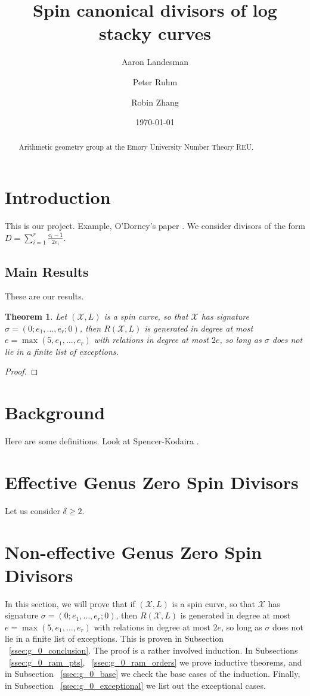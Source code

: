 \documentclass{amsart}
\title{Spin canonical divisors of log stacky curves}
\author{Aaron Landesman}
\author{Peter Ruhm}
\author{Robin Zhang}
\date{\today}
\theoremstyle{plain}
\newtheorem{thm}{Theorem}[section]
\theoremstyle{definition}
\theoremstyle{remark}
\numberwithin{equation}{section}
\newcommand \sx{\mathscr X}
\newcommand \halfcan{L}
\newcommand \subhalf[1]{\frac{e_{#1} - 1}{2e_{#1}}}
\begin{document}
\begin{abstract}
  Arithmetic geometry group at the Emory University Number Theory
	REU.
\end{abstract}

\maketitle

\section{Introduction}
This is our project.
Example, O'Dorney's paper \cite{dorney:canonical}.
We consider divisors of the form $D = \sum_{i = 1}^{r} \subhalf{i}$.

\subsection{Main Results}
These are our results.
\begin{thm}
\label{thm:g_0_generators_relations}
Let $(\sx,\halfcan)$ is a spin curve, so that $\sx$ has signature $\sigma = (0;e_1,\ldots, e_r;0)$, then $R(\sx,\halfcan)$ is generated in degree at most $e = \max(5,e_1,\ldots, e_r)$ with relations in degree at most $2e$, so long as $\sigma$ does not lie in a finite list of exceptions. 
\end{thm}
\begin{proof}

\end{proof}


\section{Background}
Here are some definitions.
Look at Spencer-Kodaira \cite{kodaira:complex-manifolds}.

\section{Effective Genus Zero Spin Divisors}
\label{sec:g_0_effective}
Let us consider $\delta \geq 2$.

\section{Non-effective Genus Zero Spin Divisors}
\label{sec:g_0_non_effective}


In this section, we will prove that if $(\sx,\halfcan)$ is a spin curve, so that $\sx$ has signature $\sigma = (0; e_1, \ldots, e_r;0)$, then $R(\sx,\halfcan)$ is generated in degree at most $e = \max(5, e_1, \ldots, e_r)$ with relations in degree at most $2e$, so long as $\sigma$ does not lie in a finite list of exceptions. This is proven in Subsection ~\ref{ssec:g_0_conclusion}. The proof is a rather involved induction. In Subsections ~\ref{ssec:g_0_ram_pts}, ~\ref{ssec:g_0_ram_orders} we prove inductive theorems, and in Subsection ~\ref{ssec:g_0_base} we check the base cases of the induction. Finally, in Subsection ~\ref{ssec:g_0_exceptional} we list out the exceptional cases.
\end{document}
